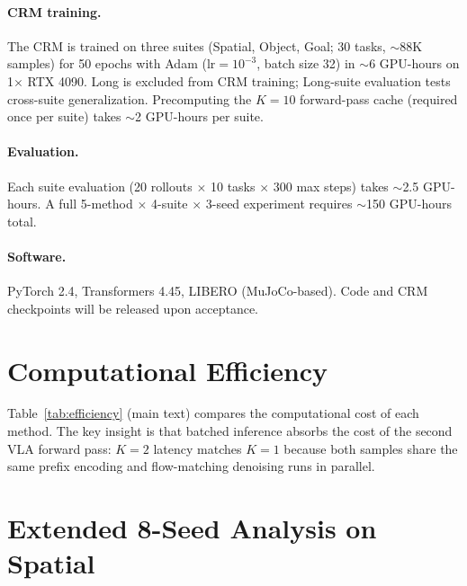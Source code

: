 \paragraph{CRM training.}
The CRM is trained on three suites (Spatial, Object, Goal; 30 tasks, ${\sim}$88K samples) for 50 epochs with Adam ($\mathrm{lr}{=}10^{-3}$, batch size 32) in ${\sim}$6 GPU-hours on 1$\times$ RTX 4090. Long is excluded from CRM training; Long-suite evaluation tests cross-suite generalization. Precomputing the $K{=}10$ forward-pass cache (required once per suite) takes ${\sim}$2 GPU-hours per suite.

\paragraph{Evaluation.}
Each suite evaluation (20 rollouts $\times$ 10 tasks $\times$ 300 max steps) takes ${\sim}$2.5 GPU-hours. A full 5-method $\times$ 4-suite $\times$ 3-seed experiment requires ${\sim}$150 GPU-hours total.

\paragraph{Software.}
PyTorch 2.4, Transformers 4.45, LIBERO (MuJoCo-based). Code and CRM checkpoints will be released upon acceptance.


\section{Computational Efficiency}
\label{sec:efficiency}

Table~\ref{tab:efficiency} (main text) compares the computational cost of each method. The key insight is that batched inference absorbs the cost of the second VLA forward pass: $K{=}2$ latency matches $K{=}1$ because both samples share the same prefix encoding and flow-matching denoising runs in parallel.


\section{Extended 8-Seed Analysis on Spatial}
\label{sec:8seed}

